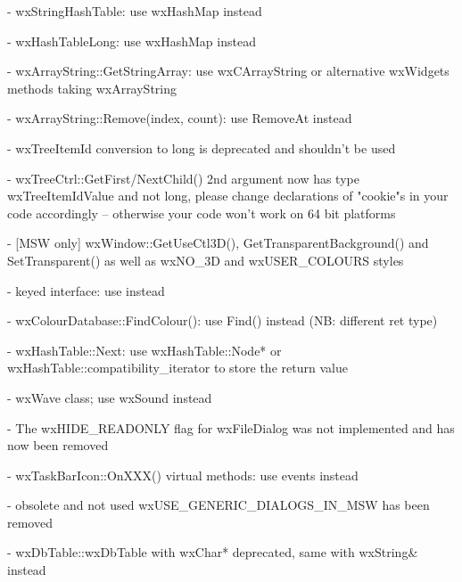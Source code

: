 - wxStringHashTable: use wxHashMap instead

- wxHashTableLong: use wxHashMap instead

- wxArrayString::GetStringArray: use wxCArrayString or alternative wxWidgets
                                 methods taking wxArrayString

- wxArrayString::Remove(index, count): use RemoveAt instead

- wxTreeItemId conversion to long is deprecated and shouldn't be used

- wxTreeCtrl::GetFirst/NextChild() 2nd argument now has type wxTreeItemIdValue
  and not long, please change declarations of "cookie"s in your code
  accordingly -- otherwise your code won't work on 64 bit platforms

- [MSW only] wxWindow::GetUseCtl3D(), GetTransparentBackground() and
             SetTransparent() as well as wxNO\_3D and wxUSER\_COLOURS styles

-  keyed interface: use  instead

- wxColourDatabase::FindColour(): use Find() instead (NB: different ret type)

- wxHashTable::Next: use wxHashTable::Node* or
                     wxHashTable::compatibility\_iterator to store the return
                     value

- wxWave class; use wxSound instead

- The wxHIDE\_READONLY flag for wxFileDialog was not implemented
  and has now been removed

- wxTaskBarIcon::OnXXX() virtual methods: use events instead

- obsolete and not used wxUSE\_GENERIC\_DIALOGS\_IN\_MSW has been removed

- wxDbTable::wxDbTable with wxChar* deprecated, same with wxString& instead
